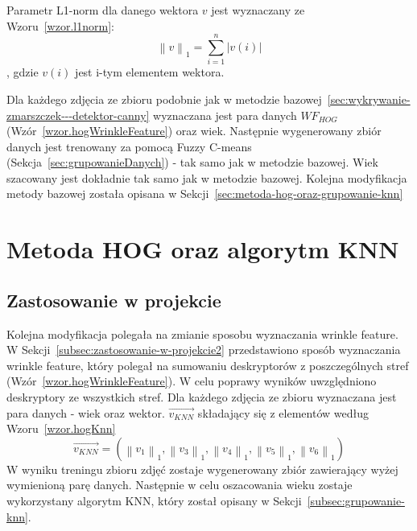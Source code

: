 \documentclass[a4paper,twoside,12pt]{book}
\begin{document}
    Parametr L1-norm dla danego wektora $v$ jest wyznaczany ze Wzoru~\ref{wzor.l1norm}:
    \large
    \begin{equation}
        \left \|v  \right \|_{1} = \sum_{i=1}^{n}\left |v(i)  \right |
        \label{wzor.l1norm}
    \end{equation}
    \normalsize
    , gdzie $v(i)$ jest i-tym elementem wektora.

    Dla każdego zdjęcia ze zbioru podobnie jak w metodzie bazowej~\ref{sec:wykrywanie-zmarszczek---detektor-canny}
    wyznaczana jest para danych $WF_{HOG}$ (Wzór~\ref{wzor.hogWrinkleFeature}) oraz wiek. Następnie wygenerowany
    zbiór danych jest trenowany za pomocą Fuzzy C-means (Sekcja~\ref{sec:grupowanieDanych}) - tak samo jak w metodzie
    bazowej.
    Wiek szacowany jest dokładnie tak samo jak w metodzie bazowej.
    Kolejna modyfikacja metody bazowej została opisana w Sekcji~\ref{sec:metoda-hog-oraz-grupowanie-knn}
    \section{Metoda HOG oraz algorytm KNN}\label{sec:metoda-hog-oraz-algorytm-knn}
    \subsection{Zastosowanie w projekcie}\label{subsec:zastosowanie-w-projekcie}
    Kolejna modyfikacja polegała na zmianie sposobu wyznaczania wrinkle feature.
    W Sekcji~\ref{subsec:zastosowanie-w-projekcie2} przedstawiono sposób wyznaczania wrinkle feature,
    który polegał na sumowaniu deskryptorów z poszczególnych stref (Wzór~\ref{wzor.hogWrinkleFeature}).
    W celu poprawy wyników uwzględniono deskryptory ze wszystkich stref.
    Dla każdego zdjęcia ze zbioru wyznaczana jest para danych - wiek oraz wektor.
    $\overrightarrow{v_{KNN}}$ składający się z elementów według Wzoru~\ref{wzor.hogKnn}
    \large
    \begin{equation}
        \overrightarrow{v_{KNN}} = (\left \|v_{1}  \right \|_{1},\left \|v_{3}  \right \|_{1},\left \|v_{4}  \right
        \|_{1},\left \|v_{5}  \right \|_{1},\left \|v_{6}  \right \|_{1})
        \label{wzor.hogKnn}
    \end{equation}
    \normalsize
    W wyniku treningu zbioru zdjęć zostaje wygenerowany zbiór zawierający wyżej wymienioną parę danych.
    Następnie w celu oszacowania wieku zostaje wykorzystany algorytm KNN, który został opisany w
    Sekcji~\ref{subsec:grupowanie-knn}.
\end{document}
